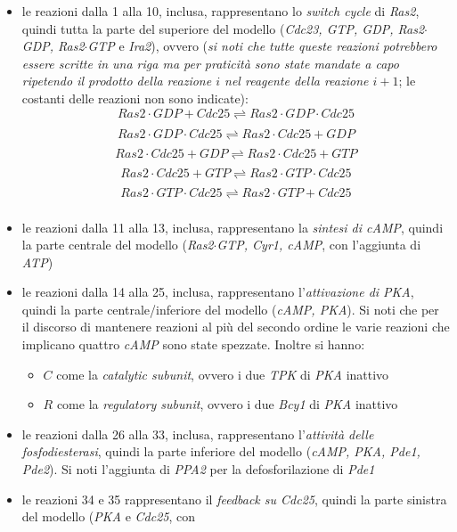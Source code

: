 \documentclass[a4paper,12pt, oneside]{book}
\begin{document}
\begin{itemize}
  \item le reazioni dalla 1 alla 10, inclusa, rappresentano lo \textit{switch
    cycle} di 
  \textit{Ras2}, quindi tutta la parte del superiore del modello
  (\textit{Cdc23, GTP, GDP, Ras2$\cdot$GDP, Ras2$\cdot$GTP} e \textit{Ira2}),
  ovvero (\textit{si noti che tutte queste reazioni potrebbero essere scritte
    in una riga ma per praticità sono state mandate a capo ripetendo il
    prodotto della reazione $i$ nel reagente della reazione $i+1$}; le
  costanti delle reazioni non sono indicate):
  \[Ras2\cdot GDP+Cdc25\underset{}{\stackrel{}{\rightleftharpoons}}
    Ras2\cdot GDP\cdot Cdc25\]
  \[Ras2\cdot GDP\cdot Cdc25\underset{}{\stackrel{}{\rightleftharpoons}}
    Ras2\cdot Cdc25+GDP\]
  \[Ras2\cdot Cdc25+GDP\underset{}{\stackrel{}{\rightleftharpoons}}
    Ras2\cdot Cdc25+GTP\]
  \[Ras2\cdot Cdc25+GTP\underset{}{\stackrel{}{\rightleftharpoons}}
    Ras2\cdot GTP\cdot Cdc25\]
  \[Ras2\cdot GTP\cdot Cdc25\underset{}{\stackrel{}{\rightleftharpoons}}
    Ras2\cdot GTP+Cdc25\]
  \item le reazioni dalla 11 alla 13, inclusa, rappresentano la
  \textit{sintesi di cAMP}, quindi la parte centrale del modello
  (\textit{Ras2$\cdot$GTP, Cyr1, cAMP}, con l'aggiunta di \textit{ATP})
  \item le reazioni dalla 14 alla 25, inclusa, rappresentano
  l'\textit{attivazione di PKA}, quindi la parte centrale/inferiore del
  modello (\textit{cAMP, PKA}). Si noti che per il discorso di mantenere
  reazioni al più del secondo ordine le varie reazioni che implicano quattro
  \textit{cAMP} sono state spezzate. Inoltre si hanno:
  \begin{itemize}
    \item $C$ come la \textit{catalytic subunit}, ovvero i due \textit{TPK}
    di \textit{PKA} inattivo
    \item $R$ come la \textit{regulatory subunit}, ovvero i due \textit{Bcy1}
    di \textit{PKA} inattivo
  \end{itemize}
  \item le reazioni dalla 26 alla 33, inclusa, rappresentano
  l'\textit{attività delle fosfodiesterasi}, quindi la parte inferiore del
  modello (\textit{cAMP, PKA, Pde1, Pde2}). Si noti l'aggiunta di
  \textit{PPA2} per la defosforilazione di \textit{Pde1}
  \item le reazioni 34 e 35 rappresentano il \textit{feedback su Cdc25},
  quindi la parte sinistra del modello (\textit{PKA} e \textit{Cdc25}, con

\end{itemize}
\end{document}
